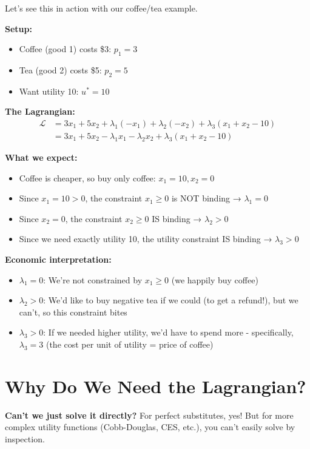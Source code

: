 \documentclass[11pt]{article}
\begin{document}
Let's see this in action with our coffee/tea example.

\textbf{Setup:}
\begin{itemize}
\item Coffee (good 1) costs \$3: $p_1 = 3$
\item Tea (good 2) costs \$5: $p_2 = 5$
\item Want utility 10: $u^* = 10$
\end{itemize}

\textbf{The Lagrangian:}
\begin{align*}
\mathcal{L} &= 3x_1 + 5x_2 + \lambda_1(-x_1) + \lambda_2(-x_2) + \lambda_3(x_1 + x_2 - 10) \\
&= 3x_1 + 5x_2 - \lambda_1 x_1 - \lambda_2 x_2 + \lambda_3(x_1 + x_2 - 10)
\end{align*}

\textbf{What we expect:}
\begin{itemize}
\item Coffee is cheaper, so buy only coffee: $x_1 = 10, x_2 = 0$
\item Since $x_1 = 10 > 0$, the constraint $x_1 \geq 0$ is NOT binding → $\lambda_1 = 0$
\item Since $x_2 = 0$, the constraint $x_2 \geq 0$ IS binding → $\lambda_2 > 0$
\item Since we need exactly utility 10, the utility constraint IS binding → $\lambda_3 > 0$
\end{itemize}

\textbf{Economic interpretation:}
\begin{itemize}
\item $\lambda_1 = 0$: We're not constrained by $x_1 \geq 0$ (we happily buy coffee)
\item $\lambda_2 > 0$: We'd like to buy negative tea if we could (to get a refund!), but we can't, so this constraint bites
\item $\lambda_3 > 0$: If we needed higher utility, we'd have to spend more - specifically, $\lambda_3 = 3$ (the cost per unit of utility = price of coffee)
\end{itemize}

\section{Why Do We Need the Lagrangian?}

\textbf{Can't we just solve it directly?} For perfect substitutes, yes! But for more complex utility functions (Cobb-Douglas, CES, etc.), you can't easily solve by inspection.
\end{document}
